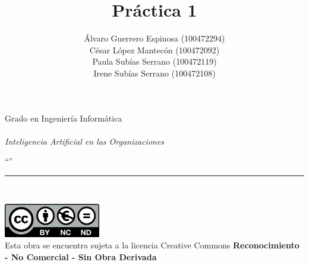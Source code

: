 \documentclass[12pt]{report} %
\begin{document}

\title{Práctica 1}
\author{Álvaro Guerrero Espinosa (100472294)\\
        César López Mantecón (100472092)\\
        Paula Subías Serrano (100472119)\\
        Irene Subías Serrano (100472108)\\}

\makeatletter
\begin{titlepage}
    \begin{sffamily}
    \color{azulUC3M}
    \begin{center}
        \begin{figure}[H] %
        \end{figure}
        \vspace{2.5cm}
        \begin{Large}
            Grado en Ingeniería Informática\\
            \@date\\
            \vspace{2cm}
            \textsl{Inteligencia Artificial en las Organizaciones}\\
            \bigskip
        \end{Large}
        {\Huge ``\@title''}\\
        \vspace*{0.5cm}
        \rule{10.5cm}{0.1mm}\\
        \vspace*{0.9cm}
        {\LARGE\@author}
        \vspace*{1cm}
    \end{center}
    \vfill
    \color{black}
    \includegraphics[width=4.2cm]{imagenes/creativecommons.png}\\ %
    Esta obra se encuentra sujeta a la licencia Creative Commons \textbf{Reconocimiento - No Comercial - Sin Obra Derivada}
    \end{sffamily}
\end{titlepage}
\makeatother
\end{document}
